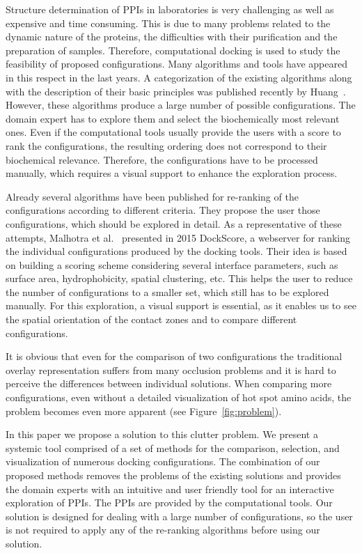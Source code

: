 \documentclass[twocolumn]{bmcart}%
\begin{document}
Structure determination of PPIs in laboratories is very challenging as well as expensive and time consuming.
This is due to many problems related to the dynamic nature of the proteins, the difficulties with their purification and the preparation of samples.
Therefore, computational docking is used to study the feasibility of proposed configurations.
Many algorithms and tools have appeared in this respect in the last years.
A categorization of the existing algorithms along with the description of their basic principles was published recently by Huang~\cite{Huang2014}.
However, these algorithms produce a large number of possible configurations.
The domain expert has to explore them and select the biochemically most relevant ones. 
Even if the computational tools usually provide the users with a score to rank the configurations, the resulting ordering does not correspond to their biochemical relevance.
Therefore, the configurations have to be processed manually, which requires a visual support to enhance the exploration process.

Already several algorithms have been published for re-ranking of the configurations according to different criteria.
They propose the user those configurations, which should be explored in detail.
As a representative of these attempts, Malhotra et al.~\cite{Malhotra2015} presented in 2015 DockScore, a webserver for ranking the individual configurations produced by the docking tools. 
Their idea is based on building a scoring scheme considering several interface parameters, such as surface area, hydrophobicity, spatial clustering, etc.
This helps the user to reduce the number of configurations to a smaller set, which still has to be explored manually.
For this exploration, a visual support is essential, as it enables us to see the spatial orientation of the contact zones and to compare different configurations.

It is obvious that even for the comparison of two configurations the traditional overlay representation suffers from many occlusion problems and it is hard to perceive the differences between individual solutions.
When comparing more configurations, even without a detailed visualization of hot spot amino acids, the problem becomes even more apparent (see Figure~\ref{fig:problem}).

In this paper we propose a solution to this clutter problem.
We present a systemic tool comprised of a set of methods for the comparison, selection, and visualization of numerous docking configurations.
The combination of our proposed methods removes the problems of the existing solutions and provides the domain experts with an intuitive and user friendly tool for an interactive exploration of PPIs.
The PPIs are provided by the computational tools.
Our solution is designed for dealing with a large number of configurations, so the user is not required to apply any of the re-ranking algorithms before using our solution. 
\end{document}
